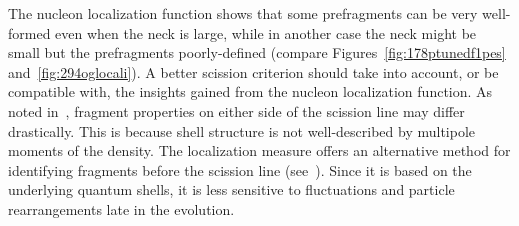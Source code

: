The nucleon localization function shows that some prefragments can be very well-formed even when the neck is large, while in another case the neck might be small but the prefragments poorly-defined (compare Figures~\ref{fig:178ptunedf1pes} and~\ref{fig:294oglocali}). A better scission criterion should take into account, or be compatible with, the insights gained from the nucleon localization function. As noted in~\cite{Younes2009}, fragment properties on either side of the scission line may differ drastically. This is because shell structure is not well-described by multipole moments of the density. The localization measure offers an alternative method for identifying fragments before the scission line (see~\cite{Sadhukhan2017}). Since it is based on the underlying quantum shells, it is less sensitive to fluctuations and particle rearrangements late in the evolution.



